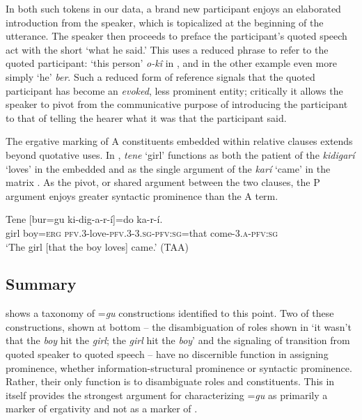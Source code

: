 \documentclass[output=paper,modfonts]{langscibook}
\begin{document}
In both such tokens in our data, a brand new participant enjoys an elaborated introduction from the speaker, which is topicalized at the beginning of the utterance. The speaker then proceeds to preface the participant’s quoted speech act with the short  ‘what he said.’ This  uses a reduced  phrase to refer to the quoted participant: ‘this person’ \textit{o-kî} in , and in the other example even more simply ‘he’ \textit{ber}. Such a reduced form of reference signals that the quoted participant has become an \textit{evoked}, less prominent entity; critically it allows the speaker to pivot from the communicative purpose of introducing the participant to that of telling the hearer what it was that the participant said.

The ergative marking of A constituents embedded within relative clauses extends beyond quotative uses. In , \textit{tene} ‘girl’ functions as both the patient of the  \textit{kidigarí} ‘loves’ in the embedded  and as the single argument of the  \textit{karí} ‘came’ in the matrix . As the pivot, or shared argument between the two clauses, the P argument enjoys greater syntactic prominence than the A term.

\ea\label{ex:wolfe:16}
\gll Tene [bur=gu ki-dig-a-r-í]=do ka-r-í.\\
    girl boy=\textsc{erg} \textsc{pfv}.3-love-\textsc{pfv}.3-3.\textsc{sg}-\textsc{pfv}:\textsc{sg}=that come-3.\textsc{a}-\textsc{pfv}:\textsc{sg}\\
\glt ‘The girl [that the boy loves] came.’ (TAA)
\z

\subsection{Summary}\label{sec:wolfe:3.6}
 shows a taxonomy of =\textit{gu} constructions identified to this point. Two of these constructions, shown at bottom – the disambiguation of roles shown in ‘it wasn’t that the \textit{boy} hit the \textit{girl}; the \textit{girl} hit the \textit{boy}’ and the signaling of transition from quoted speaker to quoted speech – have no discernible function in assigning prominence, whether informa\-tion-structural prominence or syntactic prominence. Rather, their only function is to disambiguate roles and constituents. This in itself provides the strongest argument for characterizing =\textit{gu} as primarily a marker of ergativity and not as a marker of .
\end{document}
